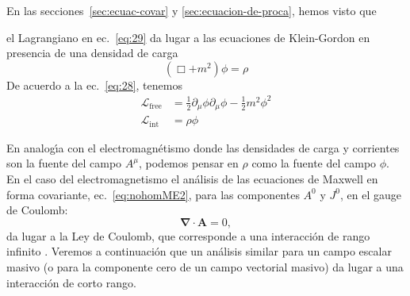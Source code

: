 En las secciones~\ref{sec:ecuac-covar} y \ref{sec:ecuacion-de-proca},
hemos visto que
\begin{frame}
el Lagrangiano en ec.~\eqref{eq:29} da lugar a las
ecuaciones de Klein-Gordon en presencia de una densidad de carga
\begin{equation}
  \label{eq:30}
  (\Box+m^2)\phi=\rho
\end{equation}
De acuerdo a la ec.~\eqref{eq:28}, tenemos
\begin{align}
\mathcal{L}_{\text{free}}&=\frac{1}{2}\partial_\mu\phi\partial_\mu\phi-\frac{1}{2} m^2\phi^2\nonumber\\
\label{eq:31}
\mathcal{L}_{\text{int}}&=\rho\phi
\end{align}
\end{frame}
En analog\'\i a con el electromagn\'etismo donde las densidades de carga y
corrientes son la fuente del campo $A^\mu$, podemos pensar en $\rho$ como
la fuente del campo $\phi$. En el caso del electromagnetismo el an\'alisis
de las ecuaciones de Maxwell en forma covariante,
ec.~\eqref{eq:nohomME2}, para las componentes $A^0$ y $J^0$, en el
gauge de Coulomb:
\begin{equation}
  \label{eq:32}
  \boldsymbol{\nabla}\cdot\mathbf{A}=0,
\end{equation}
da lugar a la Ley de Coulomb, que corresponde a una interacci\'on de
rango infinito \cite{Gross}. Veremos a continuaci\'on que un an\'alisis
similar para un campo escalar masivo (o para la componente cero de un
campo vectorial masivo) da lugar a una interacci\'on de corto rango.

